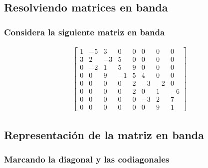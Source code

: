 \subsection{Resolviendo matrices en banda}
\begin{frame}[plain]
\frametitle{Considera la siguiente matriz en banda}
\begin{align*}
\begin{bmatrix}
1 & -5 & 3 & 0 & 0 & 0 & 0 & 0 \\
3 & 2 & -3 & 5 & 0 & 0 & 0 & 0 \\
0 & -2 & 1 & 5 & 9 & 0 & 0 & 0 \\
0 & 0 & 9 & -1 & 5 & 4 & 0 & 0 \\
0 & 0 & 0 & 0 & 2 & -3 & -2 & 0 \\
0 & 0 & 0 & 0 & 2 & 0 & 1 & -6 \\
0 & 0 & 0 & 0 & 0 & -3 & 2 & 7 \\
0 & 0 & 0 & 0 & 0 & 0 & 9 & 1 
\end{bmatrix}
\end{align*}
\end{frame}
\subsection{Representación de la matriz en banda}
\begin{frame}[plain]
\frametitle{Marcando la diagonal y las codiagonales}
\begin{figure}
    \centering
        
\end{figure}
\end{frame}
